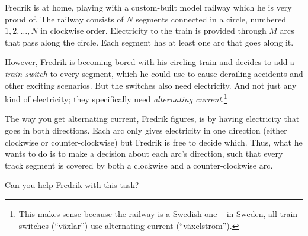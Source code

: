 \ifx\boi\undefined\fi
\def\version{jury-1}
Fredrik is at home, playing with a custom-built model railway which he is very proud of.
The railway consists of $N$ segments connected in a circle, numbered $1, 2, \dots, N$ in clockwise order.
Electricity to the train is provided through $M$ arcs that pass along the
circle. Each segment has at least one arc that goes along it.

However, Fredrik is becoming bored with his circling train and decides to add a \emph{train switch} to every segment, which he could use to cause derailing accidents and other exciting scenarios. But the switches also need electricity.
And not just any kind of electricity; they specifically need \emph{alternating current}.\footnote{This makes sense because the railway is a Swedish one -- in Sweden, all train switches (``växlar'') use alternating current (``växelström'').}




The way you get alternating current, Fredrik figures, is by having electricity
that goes in both directions. Each arc only gives electricity in one direction
(either clockwise or counter-clockwise) but Fredrik is free to decide which.
Thus, what he wants to do is to make a decision about each arc's direction,
such that every track segment is covered by both a clockwise and a
counter-clockwise arc.

Can you help Fredrik with this task?


